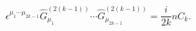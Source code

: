\begin{equation}
\epsilon^{\mu_{1}\cdots \mu_{2k-1}}
\hat{G}_{\mu_{1}}^{(2(k-1))}\cdots  
\hat{G}_{\mu_{2k-1} }^{(2(k-1))}=\frac{i}{2k}nC_{k}. 
\label{2k-2relationfrom2k1}
\end{equation}


